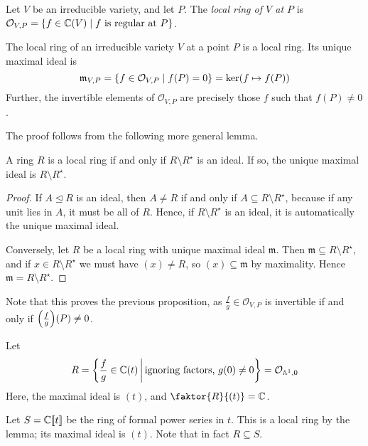 \begin{definition}
    Let \( V \) be an irreducible variety, and let \( P \).
    The \emph{local ring of \( V \) at \( P \)} is \( \mathcal O_{V,P} = \qty{f \in \mathbb C(V) \mid f \text{ is regular at } P} \).
\end{definition}
\begin{proposition}
    The local ring of an irreducible variety \( V \) at a point \( P \) is a local ring.
    Its unique maximal ideal is
    \[ \mathfrak m_{V,P} = \qty{f \in \mathcal O_{V,P} \mid f(P) = 0} = \ker (f \mapsto f(P)) \]
    Further, the invertible elements of \( \mathcal O_{V,P} \) are precisely those \( f \) such that \( f(P) \neq 0 \).
\end{proposition}
The proof follows from the following more general lemma.
\begin{lemma}
    A ring \( R \) is a local ring if and only if \( R \setminus R^\star \) is an ideal.
    If so, the unique maximal ideal is \( R \setminus R^\star \).
\end{lemma}
\begin{proof}
    If \( A \trianglelefteq R \) is an ideal, then \( A \neq R \) if and only if \( A \subseteq R \setminus R^\star \), because if any unit lies in \( A \), it must be all of \( R \).
    Hence, if \( R \setminus R^\star \) is an ideal, it is automatically the unique maximal ideal.

    Conversely, let \( R \) be a local ring with unique maximal ideal \( \mathfrak m \).
    Then \( \mathfrak m \subseteq R \setminus R^\star \), and if \( x \in R \setminus R^\star \) we must have \( (x) \neq R \), so \( (x) \subseteq \mathfrak m \) by maximality.
    Hence \( \mathfrak m = R \setminus R^\star \).
\end{proof}
Note that this proves the previous proposition, as \( \frac{f}{g} \in \mathcal O_{V,P} \) is invertible if and only if \( \qty(\frac{f}{g})(P) \neq 0 \).
\begin{example}
    Let
    \[ R = \qty{\frac{f}{g} \in \mathbb C(t) \,\middle|\,\text{ignoring factors, } g(0) \neq 0} = \mathcal O_{\mathbb A^1, 0} \]
    Here, the maximal ideal is \( (t) \), and \( \faktor{R}{(t)} = \mathbb C \).

    Let \( S = \mathbb C[\![t]\!] \) be the ring of formal power series in \( t \).
    This is a local ring by the lemma; its maximal ideal is \( (t) \).
    Note that in fact \( R \subseteq S \).
\end{example}
